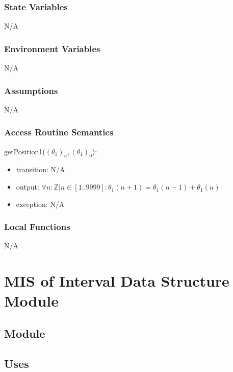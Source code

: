 \documentclass[12pt, titlepage]{article}
\begin{document}
\subsubsection{State Variables}

N/A
\subsubsection{Environment Variables}
N/A
\subsubsection{Assumptions}
N/A
\subsubsection{Access Routine Semantics}

\noindent getPosition1($(\theta_1)_n,(\theta_1)_0$):
\begin{itemize}
\item transition: N/A  
\item output: $\forall n: \mathbb{Z}| n \in[1..9999]: \theta_1(n+1) = \theta_1(n-1) + \theta_1(n)$
\item exception: N/A
\end{itemize}

\subsubsection{Local Functions}

N/A

\newpage

\section{MIS of Interval Data Structure Module} \label{IDSModule} 




\subsection{Module}


\subsection{Uses}
\end{document}
